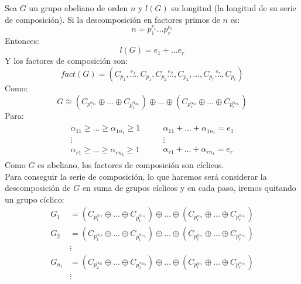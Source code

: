 \begin{ejemplo} %
    Sea $G$ un grupo abeliano de orden $n$ y $l(G)$ su longitud (la longitud de su serie de composición). Si la descomposición en factores primos de $n$ es:
    \begin{equation*}
        n = p_1^{r_1} \ldots p_r^{e_r}
    \end{equation*}
    Entonces:
    \begin{equation*}
        l(G) = e_1 + \ldots e_r
    \end{equation*}
    Y los factores de composición son:
    \begin{equation*}
        fact(G) = (C_{p_1}, \stackrel{e_1}{\ldots}, C_{p_1}, C_{p_2}\stackrel{e_2}{\ldots}, C_{p_2}, \ldots, C_{p_r} \stackrel{e_r}{\ldots}, C_{p_r})
    \end{equation*}
    Como:
    \begin{equation*}
        G \cong (C_{p_1^{\alpha_{11}}} \oplus \ldots \oplus C_{p_1^{\alpha_{1n_1}}}) \oplus \ldots \oplus (C_{p_r^{\alpha_{r1}}} \oplus \ldots \oplus C_{p_r^{\alpha_{rn_1}}})
    \end{equation*}
    Para:
    \begin{gather*}
        \begin{array}{c}
        \alpha_{11}\geq \ldots \geq \alpha_{1n_1} \geq 1 \\
        \vdots \\
        \alpha_{r1}\geq \ldots \geq \alpha_{rn_1} \geq 1 
        \end{array} \qquad 
        \begin{array}{c}
        \alpha_{11} + \ldots + \alpha_{1n_1} = e_1 \\
        \vdots \\
        \alpha_{r1} + \ldots + \alpha_{rn_1} = e_r 
        \end{array}
    \end{gather*}
    Como $G$ es abeliano, los factores de composición son cíclicos.\\

    \noindent
    Para conseguir la serie de composición, lo que haremos será considerar la descomposición de $G$ en suma de grupos cíclicos y en cada paso, iremos quitando un grupo cíclico:
    \begin{align*}
        G_1 &= (C_{p_1^{\alpha_{12}}} \oplus \ldots \oplus C_{p_1^{\alpha_{1n_1}}}) \oplus \ldots \oplus (C_{p_r^{\alpha_{r1}}} \oplus \ldots \oplus C_{p_r^{\alpha_{rn_1}}}) \\
        G_2 &= (C_{p_1^{\alpha_{13}}} \oplus \ldots \oplus C_{p_1^{\alpha_{1n_1}}}) \oplus \ldots \oplus (C_{p_r^{\alpha_{r1}}} \oplus \ldots \oplus C_{p_r^{\alpha_{rn_1}}}) \\
            &\vdots \\
        G_{n_1} &= (C_{p_2^{\alpha_{21}}} \oplus \ldots \oplus C_{p_2^{\alpha_{2n_2}}}) \oplus \ldots \oplus (C_{p_r^{\alpha_{r1}}} \oplus \ldots \oplus C_{p_r^{\alpha_{rn_1}}}) \\
                &\vdots
    \end{align*}
\end{ejemplo}

